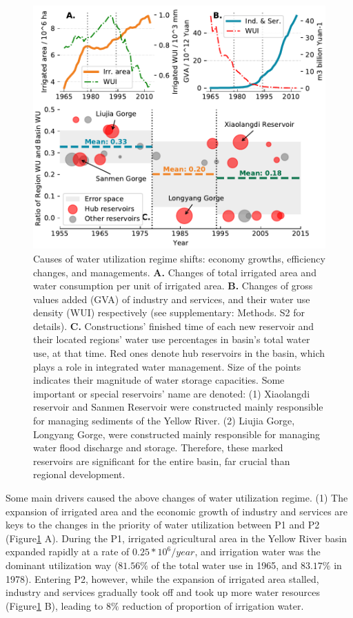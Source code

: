 \documentclass[9pt, twocolumn, twoside, lineno]{pnas-new}
\begin{document}
\begin{figure}%
	\centering
	\includegraphics[width=\linewidth]{../../figures/main/causes.pdf}
	\caption{
		Causes of water utilization regime shifts: economy growths, efficiency changes, and managements.
		\textbf{A.} Changes of total irrigated area and water consumption per unit of irrigated area.
		\textbf{B.} Changes of gross values added (GVA) of industry and services, and their water use density (WUI) respectively (see supplementary: Methods. S2 for details).
		\textbf{C.} Constructions' finished time of each new reservoir and their located regions' water use percentages in basin's total water use, at that time. Red ones denote hub reservoirs in the basin, which plays a role in integrated water management. Size of the points indicates their magnitude of water storage capacities. Some important or special reservoirs' name are denoted: (1) Xiaolangdi reservoir and Sanmen Reservoir were constructed mainly responsible for managing sediments of the Yellow River. (2) Liujia Gorge, Longyang Gorge, were constructed mainly responsible for managing water flood discharge and storage. Therefore, these marked reservoirs are significant for the entire basin, far crucial than regional development.
	}
	\label{fig:Causes}
\end{figure}

Some main drivers caused the above changes of water utilization regime.
(1) The expansion of irrigated area and the economic growth of industry and services are keys to the changes in the priority of water utilization between P1 and P2 (Figure\ref{fig:Causes} A). During the P1, irrigated agricultural area in the Yellow River basin expanded rapidly at a rate of $0.25*10^6/year$, and irrigation water was the dominant utilization way ($81.56\%$ of the total water use in 1965, and $83.17\%$ in 1978). Entering P2, however, while the expansion of irrigated area stalled, industry and services gradually took off and took up more water resources (Figure\ref{fig:Causes} B), leading to $8\%$ reduction of proportion of irrigation water.
\end{document}
